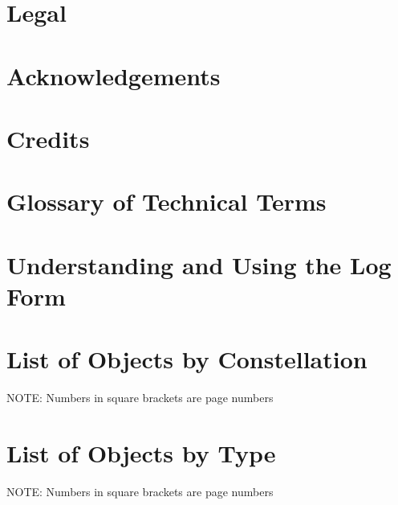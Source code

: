 \documentclass[oneside]{book}
\begin{document}
\author{The Astronomy Logbook Project}



\chapter{Legal}
\label{Legal}



\chapter{Acknowledgements}



\chapter{Credits}



\mainmatter



\chapter{Glossary of Technical Terms}



\chapter{Understanding and Using the Log Form}



\twocolumn
\chapter{List of Objects by Constellation}
NOTE: Numbers in square brackets are page numbers \\



\chapter{List of Objects by Type}
NOTE: Numbers in square brackets are page numbers \\


\onecolumn
\end{document}
